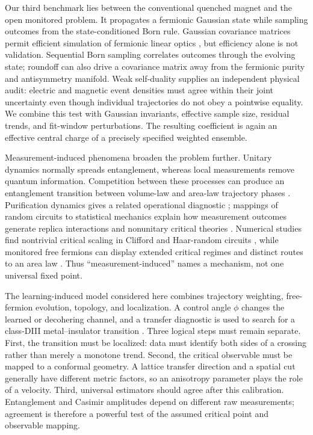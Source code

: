 \documentclass[aps,prb,reprint,superscriptaddress,longbibliography,floatfix]{revtex4-2}
\begin{document}
Our third benchmark lies between the conventional quenched magnet and the
open monitored problem.  It propagates a fermionic Gaussian state while
sampling outcomes from the state-conditioned Born rule.  Gaussian covariance
matrices permit efficient simulation of fermionic linear optics
\cite{Bravyi2005}, but efficiency alone is not validation.  Sequential Born
sampling correlates outcomes through the evolving state; roundoff can also
drive a covariance matrix away from the fermionic purity and antisymmetry
manifold.  Weak self-duality supplies an independent physical audit: electric
and magnetic event densities must agree within their joint uncertainty even
though individual trajectories do not obey a pointwise equality.  We combine
this test with Gaussian invariants, effective sample size, residual trends,
and fit-window perturbations.  The resulting coefficient is again an
effective central charge of a precisely specified weighted ensemble.

Measurement-induced phenomena broaden the problem further.  Unitary dynamics
normally spreads entanglement, whereas local measurements remove quantum
information.  Competition between these processes can produce an
entanglement transition between volume-law and area-law trajectory phases
\cite{LiChenFisher2018,SkinnerRuhmanNahum2019}.  Purification dynamics gives a
related operational diagnostic \cite{GullansHuse2020}; mappings of random
circuits to statistical mechanics explain how measurement outcomes generate
replica interactions and nonunitary critical theories
\cite{BaoChoiAltman2020,JianYouVasseurLudwig2020}.  Numerical studies find
nontrivial critical scaling in Clifford and Haar-random circuits
\cite{LuntSzyniszewskiPal2019,
ZabaloGullansWilsonGopalakrishnanHusePixley2020}, while monitored free
fermions can display extended critical regimes and distinct routes to an area
law \cite{AlbertonBuchholdDiehl2021}.  Thus ``measurement-induced'' names a
mechanism, not one universal fixed point.

The learning-induced model considered here combines trajectory weighting,
free-fermion evolution, topology, and localization.  A control angle $\phi$
changes the learned or decohering channel, and a transfer diagnostic is used
to search for a class-DIII metal--insulator transition
\cite{WangVasseurTrebstLudwigZhu2025}.  Three logical steps must remain
separate.  First, the transition must be localized: data must identify both
sides of a crossing rather than merely a monotone trend.  Second, the
critical observable must be mapped to a conformal geometry.  A lattice
transfer direction and a spatial cut generally have different metric factors,
so an anisotropy parameter plays the role of a velocity.  Third, universal
estimators should agree after this calibration.  Entanglement and Casimir
amplitudes depend on different raw measurements; agreement is therefore a
powerful test of the assumed critical point and observable mapping.
\end{document}
